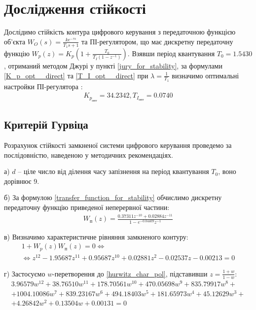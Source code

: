 \chapter{Дослідження стійкості}
Дослідимо стійкість контура цифрового керування
з передаточною функцією об'єкта $W_O(s) = \frac{k e^{-\tau s}}{T_1 s + 1}$
та ПІ-регулятором, що має дискретну передаточну функцію
$W_p(z) = K_p \left(1 + \frac{T_0}{T_I \left(1 - z^{-1}\right)}\right)$.
Взявши період квантування $T_0 = 1.5430$, отриманий методом Джурі
у пункті \ref{jury_for_stability}, за 
формулами \eqref{K_p_opt__direct} та \eqref{T_I_opt__direct}
при $\lambda = \frac{1}{T_1}$
визначимо оптимальні настройки ПІ-регулятора :
\begin{gather*}
    K_{p_{\text{опт}}} = 34.2342, T_{I_{\text{опт}}} = 0.0740
\end{gather*}

\section{Критерій Гурвіца}
Розрахунок стійкості замкненої системи цифрового керування 
проведемо за послідовністю, наведеною у методичних рекомендаціях.

а)\; $d$ -- ціле число від ділення часу запізнення на період квантування $T_0$, воно дорівнює 9.

б)\; За формулою \eqref{transfer_function_for_stability} обчислимо дискретну передаточну функцію приведеної неперервної частини:
\begin{gather*}
    W_\text{п}(z) = \frac{
        0.37311 z^{-10} + 0.02884 z^{-11}
    }{
        1 - e^{-0.04409} z^{-1}
    }
\end{gather*}

в)\; Визначимо характеристичне рівняння замкненого контуру:
\begin{gather}
    1 + W_p(z)W_\text{п}(z) = 0 \Leftrightarrow \nonumber \\ \Leftrightarrow
    z^{12} -1.95687 z^{11} + 0.95687 z^10 + 0.02881 z^2 -0.02537 z -0.00213 = 0 \label{hurwitz_char_pol}
\end{gather}

г)\; Застосуємо $w$-перетворення до \eqref{hurwitz_char_pol}, підставивши $z = \frac{1+w}{1-w}$:
\begin{gather}
    3.96579 w^{12} + 38.76510 w^{11} + 178.70561 w^{10} + 470.05698 w^9 + 835.79917 w^8 + \nonumber \\ 
    + 1004.10086 w^7 + 839.23167 w^6 + 494.18403 w^5 + 181.65973 w^4 + 45.12629 w^3 + \nonumber \\
    + 4.26842 w^2 + 0.13504 w + 0.00131 = 0 \label{hurwitz_char_pol_in_w}
\end{gather}

